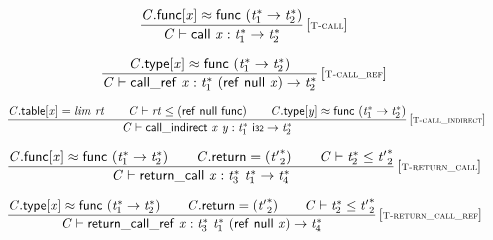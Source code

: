 $$
\begin{array}{@{}c@{}}\displaystyle
\frac{
{\mathit{C}}.\mathsf{func}[{\mathit{x}}] \approx \mathsf{func}~({{\mathit{t}}_{{1}}^\ast} \rightarrow {{\mathit{t}}_{{2}}^\ast})
}{
{\mathit{C}} \vdash \mathsf{call}~{\mathit{x}} : {{\mathit{t}}_{{1}}^\ast} \rightarrow {{\mathit{t}}_{{2}}^\ast}
} \, {[\textsc{\scriptsize T{-}call}]}
\qquad
\end{array}
$$

$$
\begin{array}{@{}c@{}}\displaystyle
\frac{
{\mathit{C}}.\mathsf{type}[{\mathit{x}}] \approx \mathsf{func}~({{\mathit{t}}_{{1}}^\ast} \rightarrow {{\mathit{t}}_{{2}}^\ast})
}{
{\mathit{C}} \vdash \mathsf{call\_ref}~{\mathit{x}} : {{\mathit{t}}_{{1}}^\ast}~(\mathsf{ref}~\mathsf{null}~{\mathit{x}}) \rightarrow {{\mathit{t}}_{{2}}^\ast}
} \, {[\textsc{\scriptsize T{-}call\_ref}]}
\qquad
\end{array}
$$

$$
\begin{array}{@{}c@{}}\displaystyle
\frac{
{\mathit{C}}.\mathsf{table}[{\mathit{x}}] = {\mathit{lim}}~{\mathit{rt}}
 \qquad
{\mathit{C}} \vdash {\mathit{rt}} \leq (\mathsf{ref}~\mathsf{null}~\mathsf{func})
 \qquad
{\mathit{C}}.\mathsf{type}[{\mathit{y}}] \approx \mathsf{func}~({{\mathit{t}}_{{1}}^\ast} \rightarrow {{\mathit{t}}_{{2}}^\ast})
}{
{\mathit{C}} \vdash \mathsf{call\_indirect}~{\mathit{x}}~{\mathit{y}} : {{\mathit{t}}_{{1}}^\ast}~\mathsf{i{\scriptstyle32}} \rightarrow {{\mathit{t}}_{{2}}^\ast}
} \, {[\textsc{\scriptsize T{-}call\_indirect}]}
\qquad
\end{array}
$$

$$
\begin{array}{@{}c@{}}\displaystyle
\frac{
{\mathit{C}}.\mathsf{func}[{\mathit{x}}] \approx \mathsf{func}~({{\mathit{t}}_{{1}}^\ast} \rightarrow {{\mathit{t}}_{{2}}^\ast})
 \qquad
{\mathit{C}}.\mathsf{return} = ({{\mathit{t}'}_{{2}}^\ast})
 \qquad
{\mathit{C}} \vdash {{\mathit{t}}_{{2}}^\ast} \leq {{\mathit{t}'}_{{2}}^\ast}
}{
{\mathit{C}} \vdash \mathsf{return\_call}~{\mathit{x}} : {{\mathit{t}}_{{3}}^\ast}~{{\mathit{t}}_{{1}}^\ast} \rightarrow {{\mathit{t}}_{{4}}^\ast}
} \, {[\textsc{\scriptsize T{-}return\_call}]}
\qquad
\end{array}
$$

$$
\begin{array}{@{}c@{}}\displaystyle
\frac{
{\mathit{C}}.\mathsf{type}[{\mathit{x}}] \approx \mathsf{func}~({{\mathit{t}}_{{1}}^\ast} \rightarrow {{\mathit{t}}_{{2}}^\ast})
 \qquad
{\mathit{C}}.\mathsf{return} = ({{\mathit{t}'}_{{2}}^\ast})
 \qquad
{\mathit{C}} \vdash {{\mathit{t}}_{{2}}^\ast} \leq {{\mathit{t}'}_{{2}}^\ast}
}{
{\mathit{C}} \vdash \mathsf{return\_call\_ref}~{\mathit{x}} : {{\mathit{t}}_{{3}}^\ast}~{{\mathit{t}}_{{1}}^\ast}~(\mathsf{ref}~\mathsf{null}~{\mathit{x}}) \rightarrow {{\mathit{t}}_{{4}}^\ast}
} \, {[\textsc{\scriptsize T{-}return\_call\_ref}]}
\qquad
\end{array}
$$

